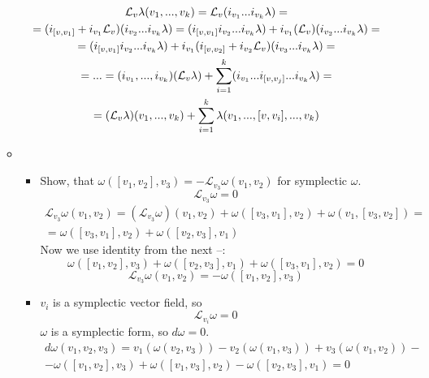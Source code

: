 \documentclass[12pt]{article}
\theoremstyle{definition}
\begin{document}
\begin{enumerate}
\begin{itemize}
\begin{multline}
        \mathcal{L}_{v}\lambda(v_1,...,v_k)=\mathcal{L}_{v}(i_{v_1}...i_{v_k}\lambda)=\\=(i_{[v,v_1]}+i_{v_1}\mathcal{L}_{v})(i_{v_2}...i_{v_k}\lambda)=(i_{[v,v_1]}i_{v_2}...i_{v_k}\lambda)+i_{v_1}(\mathcal{L}_{v})(i_{v_2}...i_{v_k}\lambda)=\\=(i_{[v,v_1]}i_{v_2}...i_{v_k}\lambda)+i_{v_1}(i_{[v,v_2]}+i_{v_2}\mathcal{L}_{v})(i_{v_3}...i_{v_k}\lambda)=\\=...=(i_{v_1},...,i_{v_k})(\mathcal{L}_{v}\lambda)+\sum_{i=1}^k\limits(i_{v_1}...i_{[v,v_j]}...i_{v_k}\lambda)=\\=(\mathcal{L}_{v}\lambda)(v_1, ... , v_k)+\sum_{i=1}^k\limits\lambda(v_1, ... , [v,v_i], ... , v_k)
    \end{multline}
    \item
    \begin{itemize}
        \item Show, that $\omega([v_1,v_2], v_3) = -\mathcal{L}_{v_3} \omega(v_1, v_2)$ for symplectic $\omega$.
        \begin{equation}
            \mathcal{L}_{v_3}\omega=0
        \end{equation}
        \begin{multline}
            \mathcal{L}_{v_3} \omega(v_1, v_2)=(\mathcal{L}_{v_3}\omega)(v_1, v_2) +\omega([v_3,v_1],v_2)+\omega(v_1,[v_3,v_2])=\\=\omega([v_3,v_1],v_2)+\omega([v_2,v_3],v_1)
        \end{multline}
        Now we use identity from the next --:
        \begin{equation}
            \omega([v_1, v_2],v_3) + \omega([v_2, v_3], v_1) +\omega([v_3,v_1],v_2) = 0
        \end{equation}
        \begin{equation}
            \boxed{\mathcal{L}_{v_3} \omega(v_1, v_2)=-\omega([v_1,v_2], v_3)}
        \end{equation}
        \item $v_i$ is a symplectic vector field, so
        \begin{equation}
            \mathcal{L}_{v_i}\omega=0
        \end{equation}
        $\omega$ is a symplectic form, so $d\omega=0$.
        \begin{multline}
            d\omega(v_1,v_2,v_3)=v_1(\omega(v_2,v_3))-v_2(\omega(v_1,v_3))+v_3(\omega(v_1,v_2))-\\-\omega([v_1,v_2],v_3)+\omega([v_1,v_3],v_2)-\omega([v_2,v_3],v_1)=0

\end{multline}
\end{itemize}
\end{itemize}
\end{enumerate}
\end{document}
